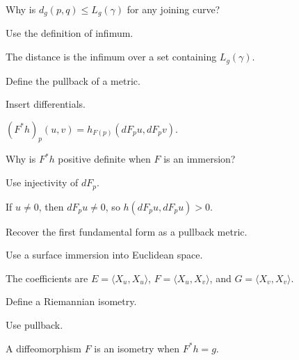 \begin{exercise}\label{exr:vii20-10}
Why is \(d_g(p,q)\le L_g(\gamma)\) for any joining curve?
\end{exercise}
\begin{hint}
Use the definition of infimum.
\end{hint}
\begin{solution}
The distance is the infimum over a set containing \(L_g(\gamma)\).
\end{solution}

\begin{exercise}\label{exr:vii20-11}
Define the pullback of a metric.
\end{exercise}
\begin{hint}
Insert differentials.
\end{hint}
\begin{solution}
\((F^*h)_p(u,v)=h_{F(p)}(dF_pu,dF_pv)\).
\end{solution}

\begin{exercise}\label{exr:vii20-12}
Why is \(F^*h\) positive definite when \(F\) is an immersion?
\end{exercise}
\begin{hint}
Use injectivity of \(dF_p\).
\end{hint}
\begin{solution}
If \(u\neq0\), then \(dF_pu\neq0\), so \(h(dF_pu,dF_pu)>0\).
\end{solution}

\begin{exercise}\label{exr:vii20-13}
Recover the first fundamental form as a pullback metric.
\end{exercise}
\begin{hint}
Use a surface immersion into Euclidean space.
\end{hint}
\begin{solution}
The coefficients are \(E=\langle X_u,X_u\rangle\), \(F=\langle X_u,X_v\rangle\), and \(G=\langle X_v,X_v\rangle\).
\end{solution}

\begin{exercise}\label{exr:vii20-14}
Define a Riemannian isometry.
\end{exercise}
\begin{hint}
Use pullback.
\end{hint}
\begin{solution}
A diffeomorphism \(F\) is an isometry when \(F^*h=g\).
\end{solution}

